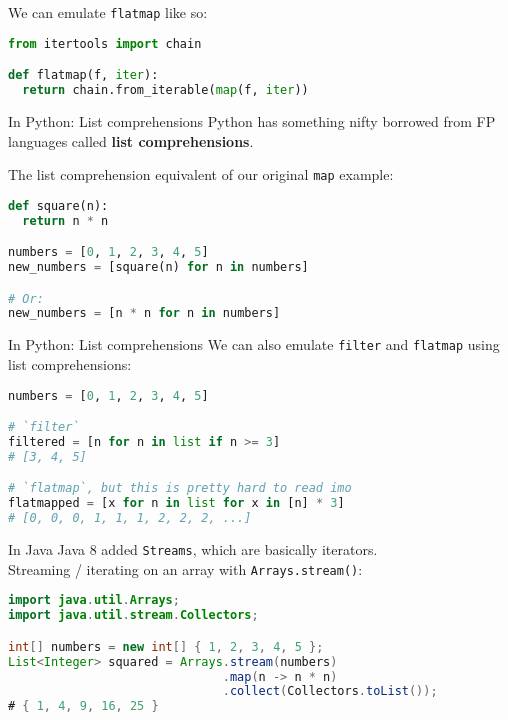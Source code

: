 \documentclass[../index.tex]{subfiles}
\begin{document}
\begin{frame}[fragile]{\currenttitle}
  We can emulate \texttt{flatmap} like so: \\[1em]

  \begin{lstlisting}[language=Python]
from itertools import chain

def flatmap(f, iter):
  return chain.from_iterable(map(f, iter))
  \end{lstlisting}
\end{frame}

\renewcommand{\currenttitle}{In Python: List comprehensions}
\begin{frame}[fragile]{\currenttitle}
  Python has something nifty borrowed from FP languages called \textbf{list
  comprehensions}.

  The list comprehension equivalent of our original \texttt{map} example:

  \begin{lstlisting}[language=Python]
def square(n):
  return n * n

numbers = [0, 1, 2, 3, 4, 5]
new_numbers = [square(n) for n in numbers]

# Or:
new_numbers = [n * n for n in numbers]
  \end{lstlisting}
\end{frame}

\begin{frame}[fragile]{\currenttitle}
  We can also emulate \texttt{filter} and \texttt{flatmap} using list
  comprehensions:

  \begin{lstlisting}[language=Python]
numbers = [0, 1, 2, 3, 4, 5]

# `filter`
filtered = [n for n in list if n >= 3]
# [3, 4, 5]

# `flatmap`, but this is pretty hard to read imo
flatmapped = [x for n in list for x in [n] * 3]
# [0, 0, 0, 1, 1, 1, 2, 2, 2, ...]
  \end{lstlisting}
\end{frame}

\renewcommand{\currenttitle}{In Java}
\begin{frame}[fragile]{\currenttitle}
  Java 8 added \texttt{Streams}, which are basically iterators. \\[1em]

  Streaming / iterating on an array with \texttt{Arrays.stream()}:

  \begin{lstlisting}[language=Java]
import java.util.Arrays;
import java.util.stream.Collectors;

int[] numbers = new int[] { 1, 2, 3, 4, 5 };
List<Integer> squared = Arrays.stream(numbers)
                              .map(n -> n * n)
                              .collect(Collectors.toList());
# { 1, 4, 9, 16, 25 }
  \end{lstlisting}
\end{frame}
\end{document}
